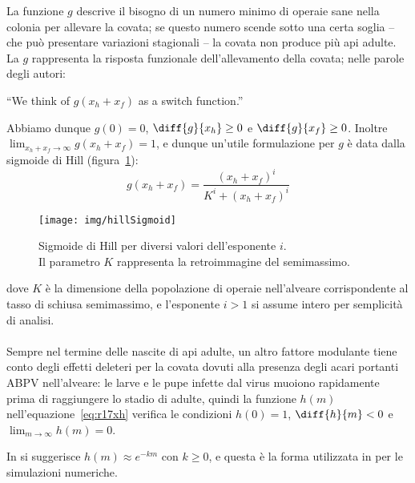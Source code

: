 La funzione $g$ descrive il bisogno di un numero minimo di operaie sane nella colonia per allevare la covata; se questo numero scende sotto una certa soglia -- che può presentare variazioni stagionali -- la covata non produce più api adulte.
La $g$ rappresenta la risposta funzionale dell'allevamento della covata; nelle parole degli autori:
\begin{displayquote}
``We think of $g(x_h + x_f)$ as a switch function.''
\end{displayquote}

Abbiamo dunque $g(0)=0$, $\diff{g}{x_h} \geq 0$ e $\diff{g}{x_f} \geq 0$. Inoltre $\lim_{x_h+x_f \to \infty} g(x_h+x_f)=1$, e dunque un'utile formulazione per $g$ è data dalla sigmoide di Hill (figura~\ref{img:hillSigmoid}):
\begin{equation}
    g(x_h + x_f) = \frac{ (x_h+x_f)^i }{ K^i + (x_h+x_f)^i }
    \label{eq:hillSigmoid}
\end{equation}

\begin{figure}
    \centering
    \texttt{[image: img/hillSigmoid]}

    \caption[Sigmoidi di Hill.]{Sigmoide di Hill per diversi valori dell'esponente $i$.
        \\ Il parametro $K$ rappresenta la retroimmagine del semimassimo.}
    \label{img:hillSigmoid}
\end{figure}

dove $K$ è la dimensione della popolazione di operaie nell'alveare corrispondente al tasso di schiusa semimassimo, e l'esponente $i>1$ si assume intero per semplicità di analisi.

\paragraph{}
Sempre nel termine delle nascite di api adulte, un altro fattore modulante tiene conto degli effetti deleteri per la covata dovuti alla presenza degli acari portanti ABPV nell'alveare: le larve e le pupe infette dal virus muoiono rapidamente prima di raggiungere lo stadio di adulte, quindi la funzione $h(m)$ nell'equazione~\ref{eq:r17xh} verifica le condizioni $h(0)=1$, $\diff{h}{m} <0$ e $\lim_{m \to \infty} h(m) = 0$.

In \cite{sumMar04} si suggerisce $h(m) \approx e^{-km}$ con $k\geq0$, e questa è la forma utilizzata in \cite{ratti2017} per le simulazioni numeriche.


